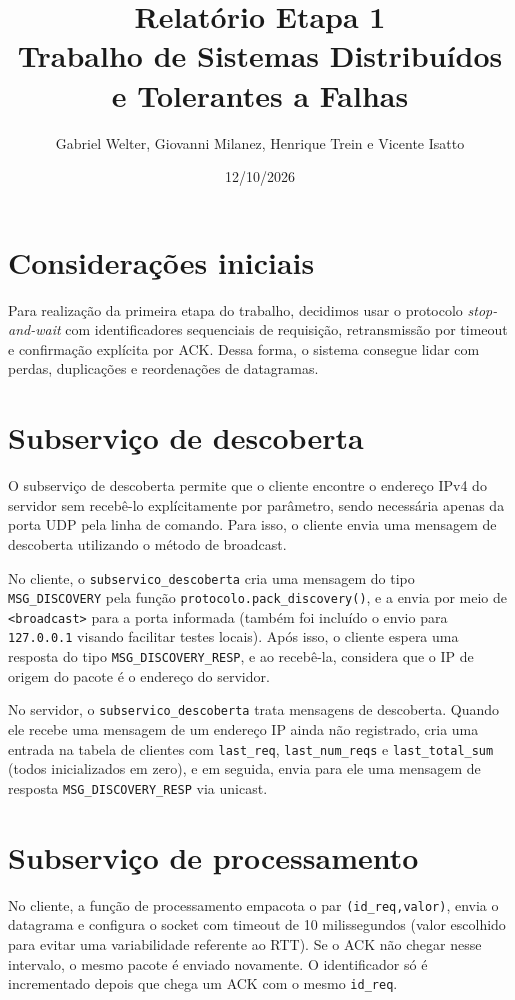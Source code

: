 \documentclass[12pt,a4paper]{article}
\title{Relatório Etapa 1\\Trabalho de Sistemas Distribuídos e Tolerantes a Falhas}
\author{Gabriel Welter, Giovanni Milanez, Henrique Trein e Vicente Isatto}
\date{12/10/2026}
\begin{document}
\maketitle

\section*{Considerações iniciais}

Para realização da primeira etapa do trabalho, decidimos usar o protocolo
\textit{stop-and-wait} com identificadores sequenciais de requisição,
retransmissão por timeout e confirmação explícita por ACK. Dessa forma, o sistema
consegue lidar com perdas, duplicações e reordenações de datagramas.

\section*{Subserviço de descoberta}

O subserviço de descoberta permite que o cliente encontre o endereço
IPv4 do servidor sem recebê-lo explícitamente por parâmetro, sendo necessária apenas da
porta UDP pela linha de comando. Para isso, o cliente envia uma mensagem de descoberta utilizando o método de broadcast.

No cliente, o \texttt{subservico\_descoberta} cria uma mensagem do tipo
\texttt{MSG\_DISCOVERY} pela função \texttt{protocolo.pack\_discovery()}, e a
envia por meio de \texttt{<broadcast>} para a porta informada (também foi incluído o envio
para \texttt{127.0.0.1} visando facilitar testes locais). Após isso, o cliente espera uma resposta do tipo
\texttt{MSG\_DISCOVERY\_RESP}, e ao recebê-la, considera que o IP de origem do pacote
é o endereço do servidor.

No servidor, o \texttt{subservico\_descoberta} trata mensagens de
descoberta. Quando ele recebe uma mensagem de um endereço IP ainda não registrado, cria
uma entrada na tabela de clientes com \texttt{last\_req},
\texttt{last\_num\_reqs} e \texttt{last\_total\_sum} (todos inicializados em zero), e em
seguida, envia para ele uma mensagem de resposta \texttt{MSG\_DISCOVERY\_RESP} via
unicast.


\section*{Subserviço de processamento}

No cliente, a função
de processamento empacota o par \texttt{(id\_req,valor)}, envia o datagrama e
configura o socket com timeout de 10 milissegundos (valor escolhido para evitar uma variabilidade referente ao RTT). Se o ACK não chegar nesse
intervalo, o mesmo pacote é enviado novamente. O identificador só é incrementado
depois que chega um ACK com o mesmo \texttt{id\_req}.
\end{document}
